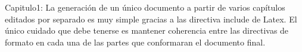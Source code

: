 Capitulo1: \newline
La generación de un único documento a partir de varios capítulos editados por separado es muy simple gracias a las directiva include de Latex. El único cuidado que debe tenerse es mantener coherencia entre las directivas de formato en cada una de las partes que conformaran el documento final.

